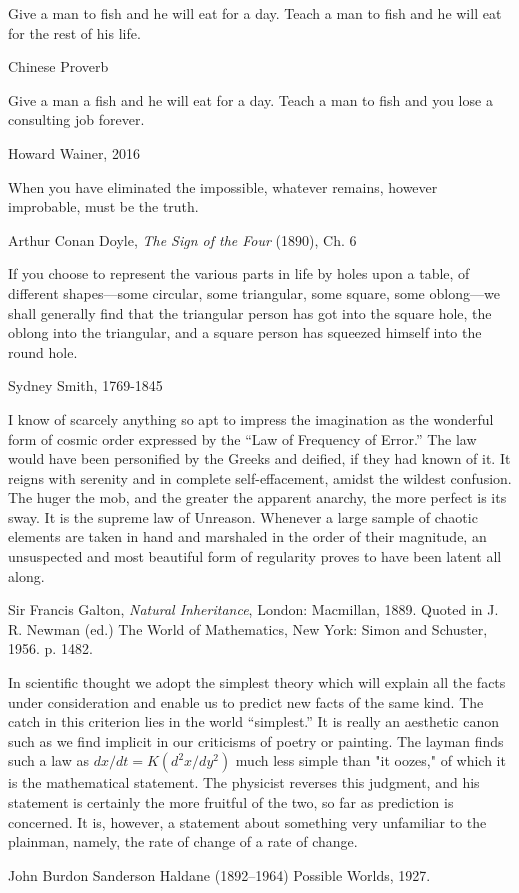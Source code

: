 \epigraph{Give a man to fish and he will eat for a day. Teach a man to fish and he will eat for the rest of his life.}{Chinese Proverb}

\epigraph{Give a man a fish and he will eat for a day. Teach a man to fish and you lose a consulting job forever.}{Howard Wainer, 2016}

\epigraph{When you have eliminated the impossible, whatever remains, however improbable, must be the truth.}{Arthur Conan Doyle, \emph{The Sign of the Four} (1890), Ch. 6}

\epigraph{If you choose to represent the various parts in life by holes upon a table, of different shapes---some circular, some triangular, some square, some oblong---we shall generally find that the triangular person has got into the square hole, the oblong into the triangular, and a square person has squeezed himself into the round hole.}{Sydney Smith, 1769-1845}


\epigraph{I know of scarcely anything so apt to impress the imagination as the wonderful form of cosmic order expressed by the ``Law of Frequency of Error.'' The law would have been personified by the Greeks and deified, if they had known of it. It reigns with serenity and in complete self-effacement, amidst the wildest confusion. The huger the mob, and the greater the apparent anarchy, the more perfect is its sway. It is the supreme law of Unreason. Whenever a large sample of chaotic elements are taken in hand and marshaled in the order of their magnitude, an unsuspected and most beautiful form of regularity proves to have been latent all along.}{Sir Francis Galton, \emph{Natural Inheritance}, London: Macmillan, 1889. Quoted in J. R. Newman (ed.) The World of Mathematics, New York: Simon and Schuster, 1956. p. 1482.}

\epigraph{In scientific thought we adopt the simplest theory which will explain all the facts under consideration and enable us to predict new facts of the same kind. The catch in this criterion lies in the world ``simplest.'' It is really an aesthetic canon such as we find implicit in our criticisms of poetry or painting. The layman finds such a law as $dx/dt = K(d^2x/dy^2)$ much less simple than "it oozes," of which it is the mathematical statement. The physicist reverses this judgment, and his statement is certainly the more fruitful of the two, so far as prediction is concerned. It is, however, a statement about something very unfamiliar to the plainman, namely, the rate of change of a rate of change.}{John Burdon Sanderson Haldane (1892--1964) Possible Worlds, 1927.}

